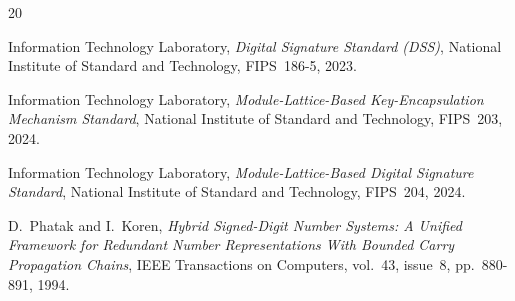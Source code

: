 \documentclass{llncs}
\begin{document}
\begin{thebibliography}{20}



Information Technology Laboratory,
\emph{Digital Signature Standard (DSS)},
National Institute of Standard and Technology, FIPS~186-5, 2023.


Information Technology Laboratory,
\emph{Module-Lattice-Based Key-Encapsulation Mechanism Standard},
National Institute of Standard and Technology, FIPS~203, 2024.

Information Technology Laboratory,
\emph{Module-Lattice-Based Digital Signature Standard},
National Institute of Standard and Technology, FIPS~204, 2024.





D.~Phatak and I.~Koren,
\emph{Hybrid Signed-Digit Number Systems: A Unified Framework for
Redundant Number Representations With Bounded Carry Propagation Chains},
IEEE Transactions on Computers, vol.~43, issue~8, pp.~880-891, 1994.


\end{thebibliography}
\end{document}
